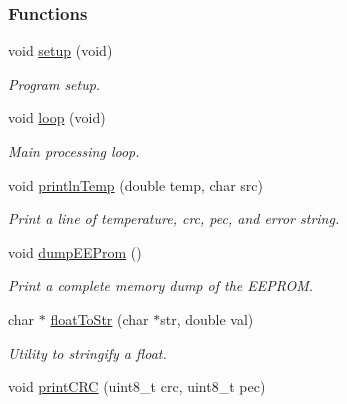 \subsubsection*{Functions}
\begin{DoxyCompactItemize}
\item 
\mbox{\label{_melexis_test_8ino_a7dfd9b79bc5a37d7df40207afbc5431f}} 
void \mbox{\hyperlink{_melexis_test_8ino_a7dfd9b79bc5a37d7df40207afbc5431f}{setup}} (void)
\begin{DoxyCompactList}\small\item\em Program setup. \end{DoxyCompactList}\item 
\mbox{\label{_melexis_test_8ino_a0b33edabd7f1c4e4a0bf32c67269be2f}} 
void \mbox{\hyperlink{_melexis_test_8ino_a0b33edabd7f1c4e4a0bf32c67269be2f}{loop}} (void)
\begin{DoxyCompactList}\small\item\em Main processing loop. \end{DoxyCompactList}\item 
void \mbox{\hyperlink{_melexis_test_8ino_a3906dd03c261bb9c83de87b9988e91ce}{println\+Temp}} (double temp, char src)
\begin{DoxyCompactList}\small\item\em Print a line of temperature, crc, pec, and error string. \end{DoxyCompactList}\item 
\mbox{\label{_melexis_test_8ino_adf7e43c01edc71026fd6c122cf408817}} 
void \mbox{\hyperlink{_melexis_test_8ino_adf7e43c01edc71026fd6c122cf408817}{dump\+E\+E\+Prom}} ()
\begin{DoxyCompactList}\small\item\em Print a complete memory dump of the E\+E\+P\+R\+OM. \end{DoxyCompactList}\item 
char $\ast$ \mbox{\hyperlink{_melexis_test_8ino_abbd67db9a56c14f56c98c750daf1ab92}{float\+To\+Str}} (char $\ast$str, double val)
\begin{DoxyCompactList}\small\item\em Utility to stringify a float. \end{DoxyCompactList}\item 
void \mbox{\hyperlink{_melexis_test_8ino_a9ca1a07ce803c9b09a05b991f0101107}{print\+C\+RC}} (uint8\+\_\+t crc, uint8\+\_\+t pec)

\end{DoxyCompactItemize}

